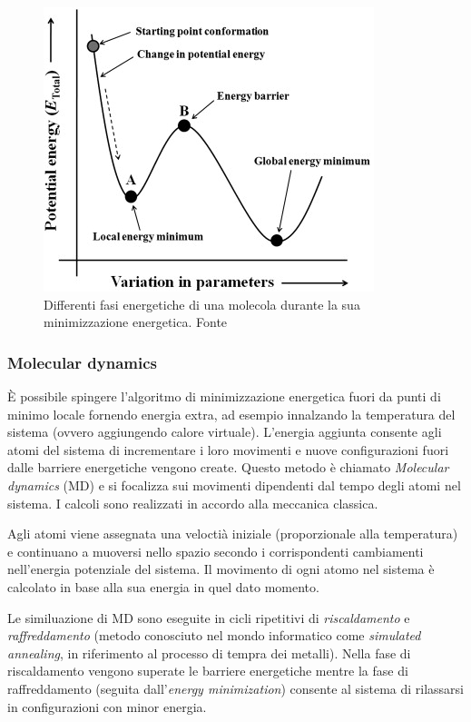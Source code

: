 \begin{figure}[!htb]
	\centering
	\includegraphics[scale=1]{images/energy-minimzation.jpg}
	\caption{Differenti fasi energetiche di una molecola durante la sua minimizzazione energetica. Fonte\cite{ROY2015151}}
	\label{fig:energy-minimization}
\end{figure}

\subsubsection{Molecular dynamics}

È possibile spingere l'algoritmo di minimizzazione energetica fuori da punti di minimo locale fornendo energia extra, ad esempio innalzando la temperatura del sistema (ovvero aggiungendo calore virtuale). L'energia aggiunta consente agli atomi del sistema di incrementare i loro movimenti e nuove configurazioni fuori dalle barriere energetiche vengono create. Questo metodo è chiamato \textit{Molecular dynamics }(MD) e si focalizza sui movimenti dipendenti dal tempo degli atomi nel sistema. I calcoli sono realizzati in accordo alla meccanica classica. 

\par Agli atomi viene assegnata una veloctià iniziale (proporzionale alla temperatura) e continuano a muoversi nello spazio secondo i corrispondenti cambiamenti nell'energia potenziale del sistema. Il movimento di ogni atomo nel sistema è calcolato in base alla sua energia in quel dato momento.

\par Le similuazione di MD sono eseguite in cicli ripetitivi di \textit{riscaldamento} e \textit{raffreddamento} (metodo conosciuto nel mondo informatico come \textit{simulated annealing}, in riferimento al processo di tempra dei metalli). Nella fase di riscaldamento vengono superate le barriere energetiche mentre la fase di raffreddamento (seguita dall'\textit{energy minimization}) consente al sistema di rilassarsi in configurazioni con minor energia.


